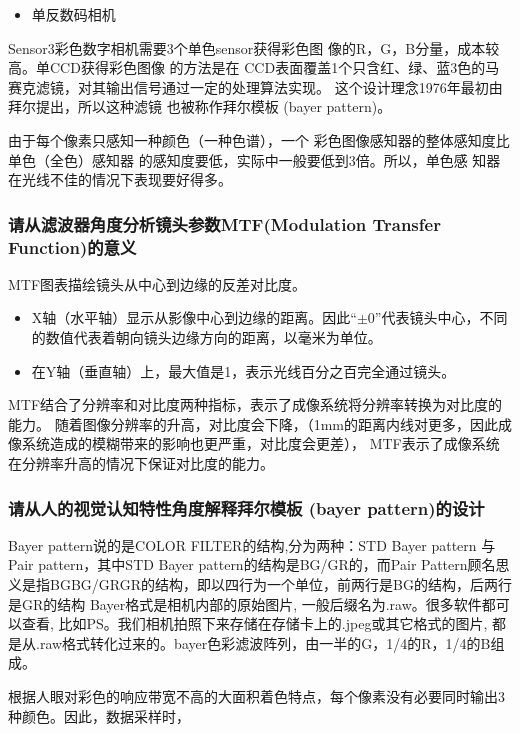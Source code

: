 \documentclass[UTF8,a4paper,AutoFakeBold,AutoFakeSlant]{ctexart}
\begin{document}
\begin{itemize}
  \item 单反数码相机
\end{itemize}

Sensor3彩色数字相机需要3个单色sensor获得彩色图
像的R，G，B分量，成本较高。单CCD获得彩色图像
的方法是在 CCD表面覆盖1个只含红、绿、蓝3色的马
赛克滤镜，对其输出信号通过一定的处理算法实现。
这个设计理念1976年最初由拜尔提出，所以这种滤镜
也被称作拜尔模板 (bayer pattern)。

由于每个像素只感知一种颜色（一种色谱），一个
彩色图像感知器的整体感知度比单色（全色）感知器
的感知度要低，实际中一般要低到3倍。所以，单色感
知器在光线不佳的情况下表现要好得多。


\subsubsection{请从滤波器角度分析镜头参数MTF(Modulation Transfer Function)的意义}

MTF图表描绘镜头从中心到边缘的反差对比度。
\begin{itemize}
  \item X轴（水平轴）显示从影像中心到边缘的距离。因此“$\pm 0$”代表镜头中心，不同的数值代表着朝向镜头边缘方向的距离，以毫米为单位。
  \item 在Y轴（垂直轴）上，最大值是1，表示光线百分之百完全通过镜头。
\end{itemize}

MTF结合了分辨率和对比度两种指标，表示了成像系统将分辨率转换为对比度的能力。
随着图像分辨率的升高，对比度会下降，（1mm的距离内线对更多，因此成像系统造成的模糊带来的影响也更严重，对比度会更差），
MTF表示了成像系统在分辨率升高的情况下保证对比度的能力。


\subsubsection{请从人的视觉认知特性角度解释拜尔模板 (bayer pattern)的设计}

Bayer pattern说的是COLOR FILTER的结构,分为两种：STD Bayer pattern 与Pair pattern，其中STD Bayer pattern的结构是BG/GR的，而Pair Pattern顾名思义是指BGBG/GRGR的结构，即以四行为一个单位，前两行是BG的结构，后两行是GR的结构
Bayer格式是相机内部的原始图片, 一般后缀名为.raw。很多软件都可以查看, 比如PS。我们相机拍照下来存储在存储卡上的.jpeg或其它格式的图片, 都是从.raw格式转化过来的。bayer色彩滤波阵列，由一半的G，1/4的R，1/4的B组成。

根据人眼对彩色的响应带宽不高的大面积着色特点，每个像素没有必要同时输出3种颜色。因此，数据采样时，
\end{document}
